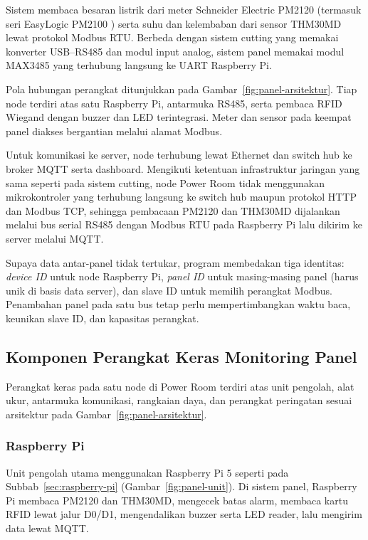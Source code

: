 Sistem membaca besaran listrik dari meter Schneider Electric PM2120 (termasuk seri EasyLogic PM2100 \citep{schneiderpm2100}) serta suhu dan kelembaban dari sensor THM30MD lewat protokol Modbus RTU. Berbeda dengan sistem cutting yang memakai konverter USB--RS485 dan modul input analog, sistem panel memakai modul MAX3485 yang terhubung langsung ke UART Raspberry Pi.

Pola hubungan perangkat ditunjukkan pada Gambar~\ref{fig:panel-arsitektur}. Tiap node terdiri atas satu Raspberry Pi, antarmuka RS485, serta pembaca RFID Wiegand dengan buzzer dan LED terintegrasi. Meter dan sensor pada keempat panel diakses bergantian melalui alamat Modbus.



Untuk komunikasi ke server, node terhubung lewat Ethernet dan switch hub ke broker MQTT serta dashboard. Mengikuti ketentuan infrastruktur jaringan yang sama seperti pada sistem cutting, node Power Room tidak menggunakan mikrokontroler yang terhubung langsung ke switch hub maupun protokol HTTP dan Modbus TCP, sehingga pembacaan PM2120 dan THM30MD dijalankan melalui bus serial RS485 dengan Modbus RTU pada Raspberry Pi lalu dikirim ke server melalui MQTT.

Supaya data antar-panel tidak tertukar, program membedakan tiga identitas: \textit{device ID} untuk node Raspberry Pi, \textit{panel ID} untuk masing-masing panel (harus unik di basis data server), dan slave ID untuk memilih perangkat Modbus. Penambahan panel pada satu bus tetap perlu mempertimbangkan waktu baca, keunikan slave ID, dan kapasitas perangkat.

\subsection{Komponen Perangkat Keras Monitoring Panel}
\label{sec:komponen-panel}

Perangkat keras pada satu node di Power Room terdiri atas unit pengolah, alat ukur, antarmuka komunikasi, rangkaian daya, dan perangkat peringatan sesuai arsitektur pada Gambar~\ref{fig:panel-arsitektur}.

\Needspace{3cm}
\subsubsection{Raspberry Pi}

Unit pengolah utama menggunakan Raspberry Pi 5 seperti pada Subbab~\ref{sec:raspberry-pi} (Gambar~\ref{fig:panel-unit}). Di sistem panel, Raspberry Pi membaca PM2120 dan THM30MD, mengecek batas alarm, membaca kartu RFID lewat jalur D0/D1, mengendalikan buzzer serta LED reader, lalu mengirim data lewat MQTT.

